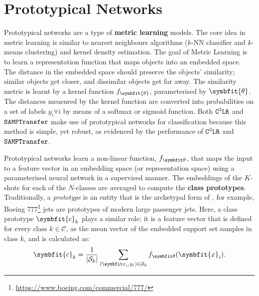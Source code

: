 \section{Prototypical Networks}\label{ssec:protonets}

Prototypical networks are a type of \textbf{metric learning} models. The core idea in metric learning is similar to nearest neighbours algorithms ($k$-NN classifier and $k$-means clustering) and kernel density estimation. The goal of Metric Learning is to learn a representation function that maps objects into an embedded space. The distance in the embedded space should preserve the objects' similarity; similar objects get closer, and dissimilar objects get far away. The similarity metric is learnt by a kernel function $f_{\symbfit{\theta}}$, parameterised by $\symbfit{\theta}$. The distances measured by the kernel function are converted into probabilities on a set of labels $y_i \forall i$ by means of a softmax or sigmoid function. Both $\texttt{C$^3$LR}$ and $\texttt{SAMPTransfer}$ make use of prototypical networks for classification because this method is simple, yet robust, as evidenced by the performance of $\texttt{C$^3$LR}$ and $\texttt{SAMPTransfer}$.

Prototypical networks learn a non-linear function, $f_{\symbfit \theta}$, that maps the input to a feature vector in an embedding space (or representation space) using a parameterised neural network in a supervised manner. The embeddings of the $K$-shots for each of the $N$-classes are averaged to compute the \textbf{class prototypes}. Traditionally, a \textit{prototype} is an entity that is the archetypal form of , for example, Boeing $777$\footnote{\url{https://www.boeing.com/commercial/777/}} jets are prototypes of modern large passenger jets.
Here, a class prototype $\symbfit{c}_k$ plays a similar role; it is a feature vector that is defined for every class $k \in \mathcal{C}$, as the mean vector of the embedded support set samples in class $k$, and is calculated as:
\begin{equation}
    \symbfit{c}_{k}=\frac{1}{|\mcS_{k}|} \sum_{({\symbfit x}_i, y_i) \in {\mcS_k}} f_{\symbfit \theta}(\symbfit{x}_{i}).
    \label{eqn:fsl-proto-calc}
\end{equation}

